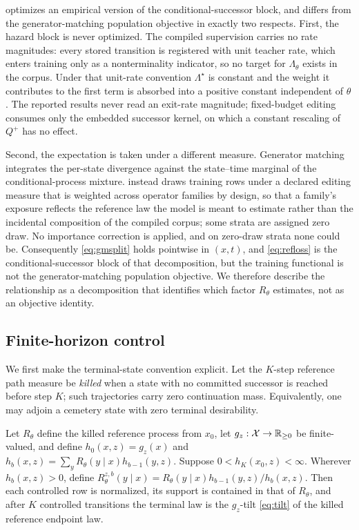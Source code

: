 \method{} optimizes an empirical version of the conditional-successor block, and differs from the generator-matching population objective in exactly two respects. First, the hazard block is never optimized. The compiled supervision carries no rate magnitudes: every stored transition is registered with unit teacher rate, which enters training only as a nonterminality indicator, so no target for $\Lambda_\theta$ exists in the corpus. Under that unit-rate convention $\Lambda^{\star}$ is constant and the weight it contributes to the first term is absorbed into a positive constant independent of $\theta$. The reported results never read an exit-rate magnitude; fixed-budget editing consumes only the embedded successor kernel, on which a constant rescaling of $Q^{+}$ has no effect.

Second, the expectation is taken under a different measure. Generator matching integrates the per-state divergence against the state--time marginal of the conditional-process mixture. \method{} instead draws training rows under a declared editing measure that is weighted across operator families by design, so that a family's exposure reflects the reference law the model is meant to estimate rather than the incidental composition of the compiled corpus; some strata are assigned zero draw. No importance correction is applied, and on zero-draw strata none could be. Consequently \eqref{eq:gmsplit} holds pointwise in $(x,t)$, and \eqref{eq:refloss} is the conditional-successor block of that decomposition, but the training functional is not the generator-matching population objective. We therefore describe the relationship as a decomposition that identifies which factor $R_\theta$ estimates, not as an objective identity.

\subsection{Finite-horizon control}
\label{app:control-proof}

We first make the terminal-state convention explicit. Let the $K$-step reference path measure be \emph{killed} when a state with no committed successor is reached before step $K$; such trajectories carry zero continuation mass. Equivalently, one may adjoin a cemetery state with zero terminal desirability.

\begin{theorem}
Let $R_\theta$ define the killed reference process from $x_0$, let $g_z:\mathcal{X}\to\mathbb R_{\ge0}$ be finite-valued, and define $h_0(x,z)=g_z(x)$ and $h_b(x,z)=\sum_y R_\theta(y\mid x)h_{b-1}(y,z)$. Suppose $0<h_K(x_0,z)<\infty$. Wherever $h_b(x,z)>0$, define $R^{z,b}_\theta(y\mid x)=R_\theta(y\mid x)h_{b-1}(y,z)/h_b(x,z)$. Then each controlled row is normalized, its support is contained in that of $R_\theta$, and after $K$ controlled transitions the terminal law is the $g_z$-tilt \eqref{eq:tilt} of the killed reference endpoint law.
\end{theorem}


